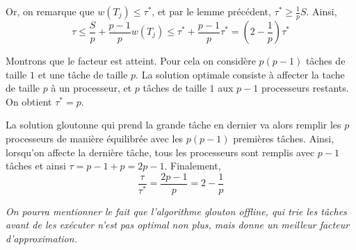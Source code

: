 Or, on remarque que $w(T_j) \leq \tau^*$, et par le lemme précédent, $\tau^* \geq \frac{1}{p}S$. Ainsi, 
$$
\tau \leq \frac{S}{p} + \frac{p-1}{p} w(T_j) \leq \tau^* +\frac{p-1}{p} \tau^* = \left(2- \frac{1}{p}\right) \tau^*
$$

Montrons que le facteur est atteint. Pour cela on considère $p(p-1)$ tâches de taille $1$ et une tâche de taille $p$. La solution optimale consiste à affecter la tache de taille $p$ à un processeur, et $p$ tâches de taille $1$ aux $p-1$ processeurs restants. On obtient $\tau^*=p$.

La solution gloutonne qui prend la grande tâche en dernier va alors remplir les $p$ processeurs de manière équilibrée avec les $p(p-1)$ premières tâches. Ainsi, lorsqu'on affecte la dernière tâche, tous les processeurs sont remplis avec $p-1$ tâches et ainsi $\tau=p-1+p=2p-1$. Finalement, 
$$
\frac{\tau}{\tau^*} = \frac{2p-1}{p}= 2 -\frac{1}{p}
$$

\begin{center}
\textit{ On pourra mentionner le fait que l'algorithme glouton offline, qui trie les tâches avant de les exécuter n'est pas optimal non plus, mais donne un meilleur facteur d'approximation.}
\end{center}